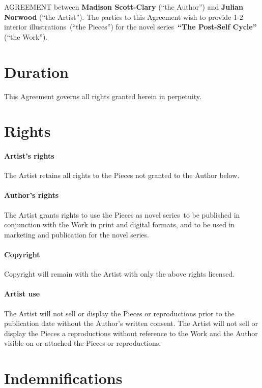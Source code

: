 \documentclass[12pt,letterpaper]{article}
\def\WorkTitle{The Post-Self Cycle}
\def\WorkAuthor{Madison Scott-Clary}
\def\WorkType{novel series}
\def\Artist{Julian Norwood}
\def\ArtType{1-2 interior illustrations}
\begin{document}
\Form

\noindent AGREEMENT between \textbf{\WorkAuthor} (``the Author'') and \textbf{\Artist} (``the Artist''). The parties to this Agreement wish to provide \ArtType\ (``the Pieces'') for the \WorkType\ \textbf{``\WorkTitle''} (``the Work'').

\section{Duration}

This Agreement governs all rights granted herein in perpetuity.

\section{Rights}

\paragraph{Artist's rights}

The Artist retains all rights to the Pieces not granted to the Author below.

\paragraph{Author's rights}

The Artist grants rights to use the Pieces as \WorkType\ to be published in conjunction with the Work in print and digital formats, and to be used in marketing and publication for the \WorkType.

\paragraph{Copyright}

Copyright will remain with the Artist with only the above rights licensed.

\paragraph{Artist use}

The Artist will not sell or display the Pieces or reproductions prior to the publication date without the Author's written consent. The Artist will not sell or display the Pieces a reproductions without reference to the Work and the Author visible on or attached the Pieces or reproductions.

\section{Indemnifications}
\end{document}
